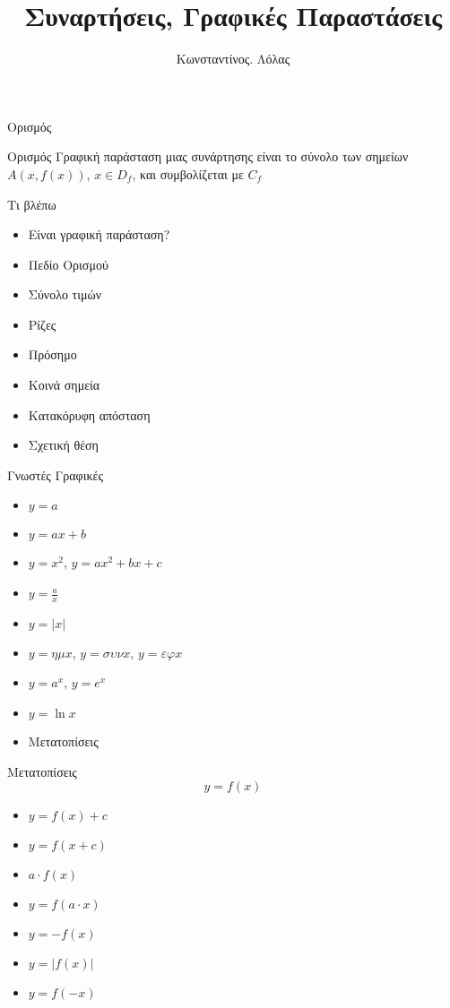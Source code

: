 \documentclass[greek]{beamer}
\title{Συναρτήσεις, Γραφικές Παραστάσεις}
\author[Λόλας]{Κωνσταντίνος. Λόλας}
\date{}
\begin{document}
\begin{frame}
 \titlepage
\end{frame}
\begin{frame}{Ορισμός}
 \begin{block}{Ορισμός}
  Γραφική παράσταση μιας συνάρτησης είναι το σύνολο των σημείων $A(x,f(x))$, $x\in D_f$, και συμβολίζεται με $C_f$
 \end{block}
\end{frame}

\begin{frame}{Τι βλέπω}
 \begin{itemize}
  \item<1-> Είναι γραφική παράσταση?
  \item<2-> Πεδίο Ορισμού
  \item<3-> Σύνολο τιμών
  \item<4-> Ρίζες
  \item<5-> Πρόσημο
  \item<6-> Κοινά σημεία
  \item<7-> Κατακόρυφη απόσταση
  \item<8-> Σχετική θέση
 \end{itemize}
\end{frame}

\begin{frame}{Γνωστές Γραφικές}
 \begin{itemize}
  \item<1-> $y=a$
  \item<2-> $y=ax+b$
  \item<3-> $y=x^2$, $y=ax^2+bx+c$
  \item<4-> $y=\frac{a}{x}$
  \item<5-> $y=|x|$
  \item<6-> $y=ημ x$, $y=συν x$, $y=εφ x$
  \item<7-> $y=a^x$, $y=e^x$
  \item<8-> $y=\ln x$
  \item<9-> Μετατοπίσεις
 \end{itemize}
\end{frame}

\begin{frame}{Μετατοπίσεις}
 $$y=f(x)$$
 \begin{itemize}
  \item<1-> $y=f(x)+c$
  \item<2-> $y=f(x+c)$
  \item<3-> $a\cdot f(x)$
  \item<4-> $y=f(a\cdot x)$
  \item<5-> $y=-f(x)$
  \item<6-> $y=|f(x)|$
  \item<7-> $y=f(-x)$
 \end{itemize}
\end{frame}
\end{document}
